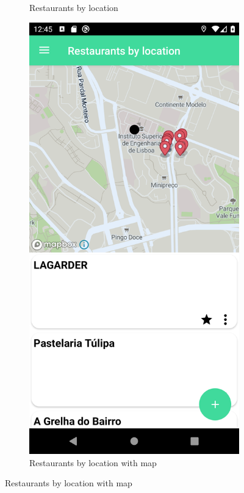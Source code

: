 \begin{figure}[H]
\begin{center}
\begin{subfigure}{.3\textwidth}
            \caption{Restaurants by location} 
        \end{subfigure}
        \begin{subfigure}{.3\textwidth}
            \includegraphics[scale=0.1, width=\textwidth]{_figures/restaurants_map.png}
            \caption{Restaurants by location with map} 
        \end{subfigure}%
    \end{center}
\end{figure}

